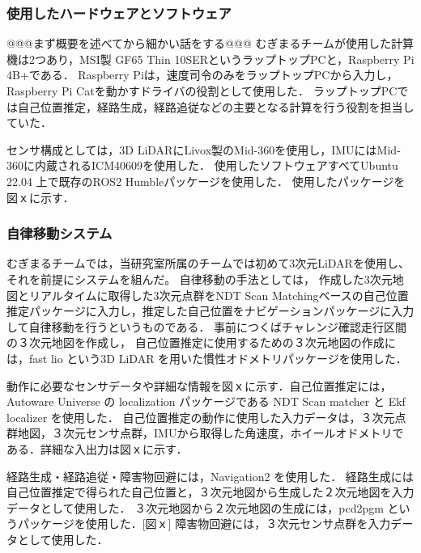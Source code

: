 \documentclass[twocolumn,9pt]{jsproceedings}
\begin{document}
\subsubsection{使用したハードウェアとソフトウェア}

@@@まず概要を述べてから細かい話をする@@@
むぎまるチームが使用した計算機は2つあり，MSI製 GF65 Thin 10SERというラップトップPCと，Raspberry Pi 4B+である．
Raspberry Piは，速度司令のみをラップトップPCから入力し，Raspberry Pi Catを動かすドライバの役割として使用した．
ラップトップPCでは自己位置推定，経路生成，経路追従などの主要となる計算を行う役割を担当していた．

センサ構成としては，3D LiDARにLivox製のMid-360を使用し，IMUにはMid-360に内蔵されるICM40609を使用した．
使用したソフトウェアすべてUbuntu 22.04 上で既存のROS2 Humbleパッケージを使用した．
使用したパッケージを図ｘに示す．

\subsubsection{自律移動システム}

むぎまるチームでは，当研究室所属のチームでは初めて3次元LiDARを使用し、それを前提にシステムを組んだ。
自律移動の手法としては，
作成した3次元地図とリアルタイムに取得した3次元点群をNDT Scan Matchingベースの自己位置推定パッケージに入力し，推定した自己位置をナビゲーションパッケージに入力して自律移動を行うというものである．
事前につくばチャレンジ確認走行区間の３次元地図を作成し，
自己位置推定に使用するための３次元地図の作成には，fast lio という3D LiDAR を用いた慣性オドメトリパッケージを使用した．

動作に必要なセンサデータや詳細な情報を図ｘに示す．自己位置推定には，Autoware Universe の localization パッケージである NDT Scan matcher と Ekf localizer を使用した．
自己位置推定の動作に使用した入力データは，３次元点群地図，３次元センサ点群，IMUから取得した角速度，ホイールオドメトリである．詳細な入出力は図ｘに示す．

経路生成・経路追従・障害物回避には，Navigation2 を使用した．
経路生成には自己位置推定で得られた自己位置と，３次元地図から生成した２次元地図を入力データとして使用した．
３次元地図から２次元地図の生成には，pcd2pgm というパッケージを使用した．[図ｘ] 障害物回避には，３次元センサ点群を入力データとして使用した．

\end{document}

